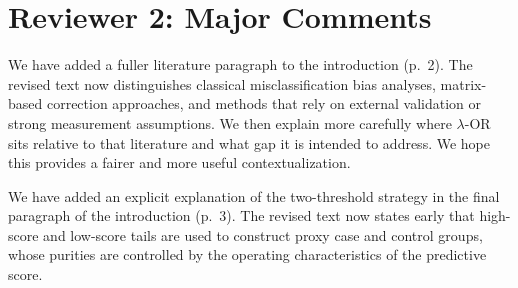 \documentclass[onecolumn,11pt]{IEEEtran}
\begin{document}























\section*{Reviewer 2: Major Comments}
We have added a fuller literature paragraph to the introduction (p.~2). The revised text now distinguishes classical misclassification bias analyses, matrix-based correction approaches, and methods that rely on external validation or strong measurement assumptions. We then explain more carefully where $\lambda$-OR sits relative to that literature and what gap it is intended to address. We hope this provides a fairer and more useful contextualization.

We have added an explicit explanation of the two-threshold strategy in the final paragraph of the introduction (p.~3). The revised text now states early that high-score and low-score tails are used to construct proxy case and control groups, whose purities are controlled by the operating characteristics of the predictive score.
\end{document}
